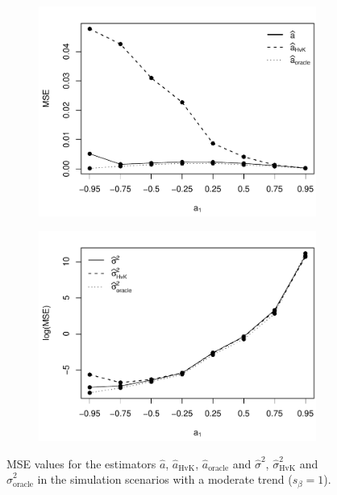 \begin{figure}[t!]
\begin{subfigure}[b]{0.475\textwidth}
\includegraphics[width=\textwidth]{Plots/MSE_a1_T=500_slope=100_(L1,L2,K1,K2,M1,M2)=(25,25,5,10,20,30).pdf}
\end{subfigure}\hspace{0.25cm}
\begin{subfigure}[b]{0.475\textwidth}
\includegraphics[width=\textwidth]{Plots/MSE_lrv_T=500_slope=10_(L1,L2,K1,K2,M1,M2)=(25,25,5,10,20,30).pdf}
\end{subfigure}
\caption{MSE values for the estimators $\widehat{a}$, $\widehat{a}_{\text{HvK}}$, $\widehat{a}_{\text{oracle}}$ and $\widehat{\sigma}^2$, $\widehat{\sigma}^2_{\text{HvK}}$ and $\widehat{\sigma}^2_{\text{oracle}}$ in the simulation scenarios with a moderate trend ($s_\beta=1$).}\label{fig:MSE_slope1}
\end{figure}

